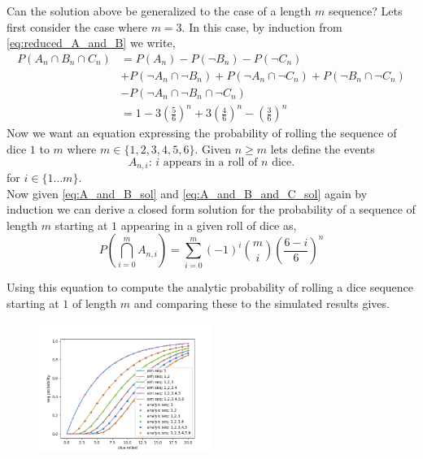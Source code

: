 \documentclass[12pt,a4paper]{article}
\begin{document}
Can the solution above be generalized to the case of a length $m$ sequence? Lets first consider the case where $m=3$. In this case, by induction from \cref{eq:reduced_A_and_B} we write,\\

\begin{align}
P(A_n \cap B_n \cap C_n)    &= P(A_n) - P(\neg B_n) - P(\neg C_n)\\
                            &+ P(\neg A_n \cap \neg B_n) + P(\neg A_n \cap \neg C_n) + P(\neg B_n \cap \neg C_n)\\ 
                            &- P(\neg A_n \cap \neg B_n \cap \neg C_n)\\
                            &= 1 - 3\left(\frac{5}{6}\right)^n + 3\left(\frac{4}{6}\right)^n - \left(\frac{3}{6}\right)^n
\label{eq:A_and_B_and_C_sol}
\end{align}
Now we want an equation expressing the probability of rolling the sequence of dice $1$ to $m$ where $m\in\{1,2,3,4,5,6\}$. Given $n\geq m$ lets define the events
\begin{equation*}
A_{n,i} \text{: $i$ appears in a roll of $n$ dice.}
\end{equation*}
for $i \in \{1\ldots m\}$.\\

Now given \cref{eq:A_and_B_sol} and \cref{eq:A_and_B_and_C_sol} again by induction we can derive a closed form solution for the probability of a sequence of length $m$ starting at $1$ appearing in a given roll of dice as,
\begin{equation}
P\left(\bigcap_{i=0}^m A_{n,i}\right) = \sum_{i=0}^{m} (-1)^i \binom{m}{i}\left( \frac{6-i}{6} \right)^n
\end{equation}

Using this equation to compute the analytic probability of rolling a dice sequence starting at $1$ of length $m$ and comparing these to the simulated results gives.

\begin{figure}[H]
    \centering
    \includegraphics[width=0.5\textwidth]{figs/full_compare_analytic_sim.png}
    \caption{}
    \label{fig:full_compare_analytic_sim}
\end{figure}
\end{document}
